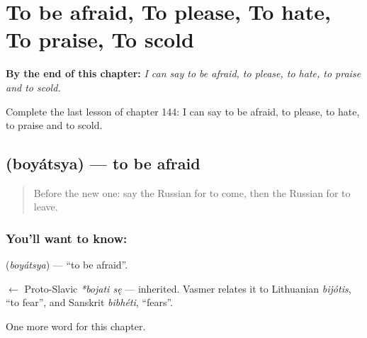 
\chapter{To be afraid, To please, To hate, To praise, To scold}
\label{ch:ru-to-be-afraid-to-please-to-hate-to-praise-to-scold}

\begin{chapteropening}
\textbf{By the end of this chapter:} \emph{I can say to be afraid, to please, to hate, to praise and to scold.}

Complete the last lesson of chapter 144: I can say to be afraid, to please, to hate, to praise and to scold.
\end{chapteropening}

\section[\texorpdfstring{\ru{бояться} (boyátsya)}{бояться (boyátsya)}]{ (boyátsya) — to be afraid}

\label{lesson:RU-C144-boyatsya}



\begin{quote}
Before the new one: say the Russian for to come, then the Russian for to leave.
\end{quote}

\subsection*{You'll want to know: }
\textbf{} (\emph{boyátsya}) — \textquotedblleft{}to be afraid\textquotedblright{}.

\begin{cousinweb}
\textbf{} $\leftarrow$ Proto-Slavic \emph{*bojati sę} — inherited. Vasmer relates it to Lithuanian \emph{bijótis}, \textquotedblleft{}to fear\textquotedblright{}, and Sanskrit \emph{bibhéti}, \textquotedblleft{}fears\textquotedblright{}.
\end{cousinweb}

\begin{grammarlens}[title={What you've built}]
One more word for this chapter.
\end{grammarlens}

